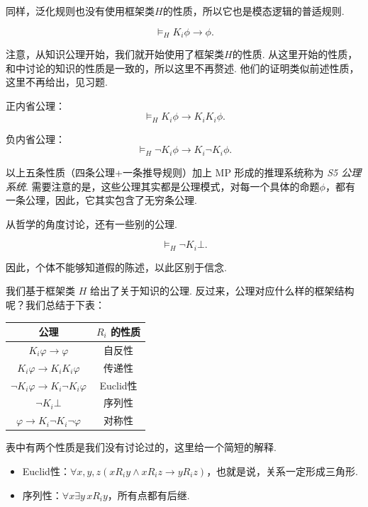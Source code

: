 同样，泛化规则也没有使用框架类$H$的性质，所以它也是模态逻辑的普适规则. 

\begin{proposition}
\[\vDash_H K_i\phi\to\phi.\]
\end{proposition}

注意，从知识公理开始，我们就开始使用了框架类$H$的性质. 从这里开始的性质，和中讨论的知识的性质是一致的，所以这里不再赘述. 他们的证明类似前述性质，这里不再给出，见习题. 

\begin{proposition}[内省公理]
正内省公理：
\[\vDash_H K_i\phi\to K_iK_i\phi.\]

负内省公理：
\[\vDash_H \neg K_i\phi\to K_i\neg K_i\phi.\]
\end{proposition}

以上五条性质（四条公理+一条推导规则）加上 MP 形成的推理系统称为 \textit{S5 公理系统}. 需要注意的是，这些公理其实都是公理模式，对每一个具体的命题$\phi$，都有一条公理，因此，它其实包含了无穷条公理. 

从哲学的角度讨论，还有一些别的公理. 

\begin{proposition}[一致性公理]
\[\vDash_H\neg K_i\bot.\]
\end{proposition}

因此，个体不能够知道假的陈述，以此区别于信念. 

我们基于框架类 $H$ 给出了关于知识的公理. 反过来，公理对应什么样的框架结构呢？我们总结于下表：

\begin{center}
    \begin{tabular}{cc}
        \toprule 公理 &  $R_i$ 的性质 \\
        \midrule $K_i \varphi \to \varphi$ & 自反性 \\
        $K_i \varphi \to K_i K_i \varphi$ & 传递性 \\
        $\neg K_i \varphi \to K_i \neg K_i \varphi$ & Euclid性 \\
        $\neg K_i\bot$  & 序列性\\
        $\varphi \to K_i \neg K_i \neg \varphi$ & 对称性 \\
        \bottomrule
    \end{tabular}
\end{center}

表中有两个性质是我们没有讨论过的，这里给一个简短的解释. 
\begin{itemize}
    \item Euclid性：$\forall x,y,z(xR_iy\wedge xR_iz\to yR_iz)$，也就是说，关系一定形成三角形. 
    \item 序列性：$\forall x\exists y\, xR_iy$，所有点都有后继. 
\end{itemize}


